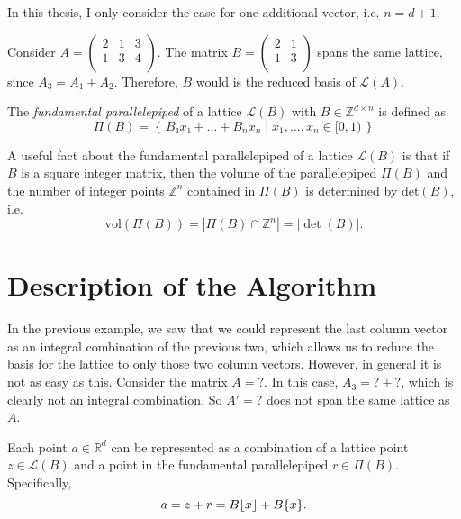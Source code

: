 In this thesis, I only consider the case for one additional vector, i.e. $n = d + 1$.

\begin{example}
  Consider $A = \begin{pmatrix}
    2 & 1 & 3 \\
    1 & 3 & 4 \\
  \end{pmatrix}$.
  The matrix $B = \begin{pmatrix}
    2 & 1 \\
    1 & 3 \\
  \end{pmatrix}$
  spans the same lattice,
  since $A_3 = A_1 + A_2$.
  Therefore, $B$ would is the reduced basis of $\mathcal L(A)$.
\end{example}


\begin{definition}
  The \emph{fundamental parallelepiped} of a lattice $\mathcal{L}(B)$ with $B ∈ ℤ^{d × n}$ is defined as
  \[
    Π(B) = \left\{\, B₁ x₁ + \dots + B_n x_n \mid x_1, \dots, x_n ∈ [0, 1) \,\right\}
  \]
\end{definition}

A useful fact about the fundamental parallelepiped of a lattice $\mathcal L(B)$ is that
if $B$ is a square integer matrix,
then the volume of the parallelepiped $Π(B)$ and
the number of integer points $ℤ^n$ contained in $Π(B)$ is determined by $\mathrm{det}(B)$,
i.e.
\[
  \mathrm{vol}(Π(B)) = |Π(B) ∩ ℤ^n| = |\det(B)|.
\]

\section{Description of the Algorithm}

In the previous example,
we saw that we could represent the last column vector as an integral
combination of the previous two,
which allows us to reduce the basis for the lattice to only those two column vectors.
However, in general it is not as easy as this.
Consider the matrix $A = ?$.
In this case, $A_3 = ? + ?$, which is clearly not an integral combination.
So $A' = ?$ does not span the same lattice as $A$.

Each point $a ∈ ℝ^d$ can be represented as a combination of a lattice point $z
∈ \mathcal{L}(B)$ and a point in the fundamental parallelepiped $r ∈ Π(B)$.
Specifically,
\[
  a = z + r = B\lfloor x\rfloor + B\{x\}.
\]

